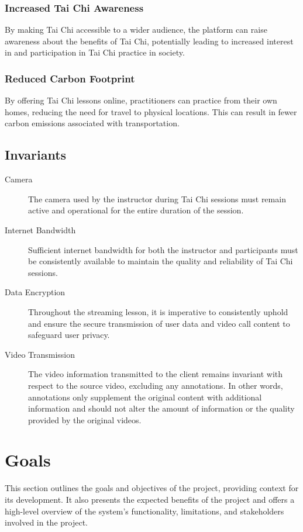 \documentclass[12pt]{article}
\begin{document}
\subsubsection{Increased Tai Chi Awareness}
By making Tai Chi accessible to a wider audience, the platform can raise awareness about the benefits of Tai Chi, potentially leading to increased interest in and participation in Tai Chi practice in society.
\subsubsection{Reduced Carbon Footprint}
By offering Tai Chi lessons online, practitioners can practice from their own homes, reducing the need for travel to physical locations. This can result in fewer carbon emissions associated with transportation.

\subsection{Invariants}
\begin{description}
    \item[Camera] The camera used by the instructor during Tai Chi sessions must remain active and operational for the entire duration of the session.
    \item[Internet Bandwidth] Sufficient internet bandwidth for both the instructor and participants must be consistently available to maintain the quality and reliability of Tai Chi sessions.
    \item[Data Encryption] Throughout the streaming lesson, it is imperative to consistently uphold and ensure the secure transmission of user data and video call content to safeguard user privacy.
    \item[Video Transmission] The video information transmitted to the client remains invariant with respect to the source video, excluding any annotations. In other words, annotations only supplement the original content with additional information and should not alter the amount of information or the quality provided by the original videos.
\end{description}

\section{Goals}
This section outlines the goals and objectives of the project, providing context for its development. It also presents the expected benefits of the project and offers a high-level overview of the system’s functionality, limitations, and stakeholders involved in the project.
\end{document}
